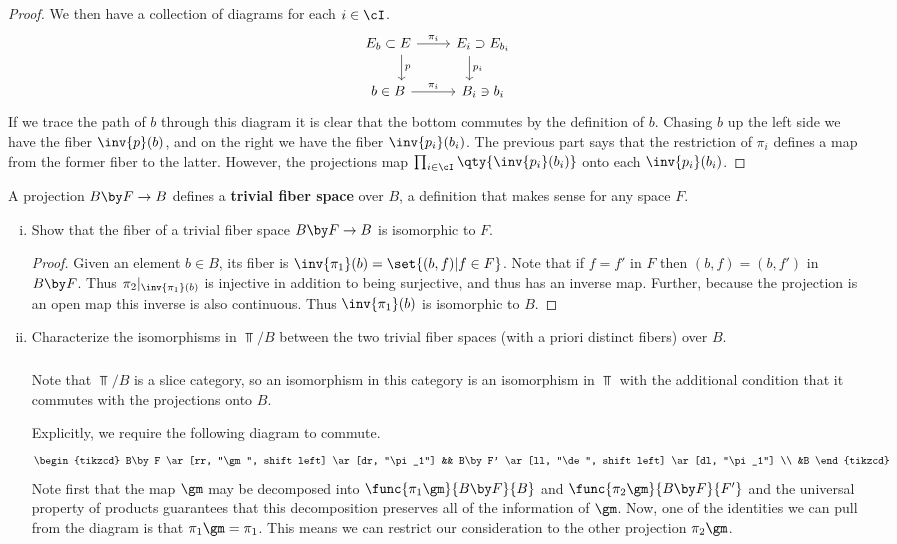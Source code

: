 \documentclass[main.tex]{subfiles}
\begin{document}
\begin{exercise}
\begin{enumerate}[(i)]
\begin{proof}
				We then have a collection of diagrams for each \(i\in\cI\).
				\begin{equation*}\begin{tikzcd}
						E_b\subset E \ar[r, "\pi_i"] \ar[d, "p", shift left=4] &
						E_i\supset E_{b_i} \ar[d, "p_i", shift right=4] \\
						b\in B \ar[r, "\pi_i"] & B_i\ni b_i
				\end{tikzcd}\end{equation*}
				If we trace the path of \(b\) through this diagram it is clear
				that the bottom commutes by the definition of \(b\). Chasing
				\(b\) up the left side we have the fiber \(\inv{p}(b)\), and on
				the right we have the fiber \(\inv{p_i}(b_i)\). The previous
				part says that the restriction of \(\pi_i\) defines a map from
				the former fiber to the latter. However, the projections map
				\(\prod_{i\in\cI}\qty{\inv{p_i}(b_i)}\) onto each
				\(\inv{p_i}(b_i)\).
			\end{proof}
	\end{enumerate}
	A projection \(B\by F\to B\) defines a \textbf{trivial fiber space} over
	\(B\), a definition that makes sense for any space \(F\).
	\begin{enumerate}[(i),resume]
		\item Show that the fiber of a trivial fiber space \(B\by F\to B\) is
			isomorphic to \(F\).
			\begin{proof}
				Given an element \(b\in B\), its fiber is
				\(\inv{\pi_1}(b)=\set{(b,f)|f\in F}\). Note that if \(f=f'\) in
				\(F\) then \((b,f)=(b,f')\) in \(B\by F\). Thus
				\(\pi_2|_{\inv{\pi_1}(b)}\) is injective in addition to being
				surjective, and thus has an inverse map. Further, because the
				projection is an open map this inverse is also continuous. Thus
				\(\inv{\pi_1}(b)\) is isomorphic to \(B\).
			\end{proof}

			\pagebreak
		\item Characterize the isomorphisms in \(\Top/B\) between the two
			trivial fiber spaces (with a priori distinct fibers) over \(B\).

			\subparagraph{}
			Note that \(\Top/B\) is a slice category, so an isomorphism in this
			category is an isomorphism in \(\Top\) with the additional condition
			that it commutes with the projections onto \(B\).

			Explicitly, we require the following diagram to commute.
			\[\begin{tikzcd}
					B\by F \ar[rr, "\gm", shift left] \ar[dr, "\pi_1"] &&
					B\by F' \ar[ll, "\de", shift left] \ar[dl, "\pi_1"] \\ &B
			\end{tikzcd}\]
			Note first that the map \(\gm\) may be decomposed into
			\(\func{\pi_1\gm}{B\by F}{B}\) and \(\func{\pi_2\gm}{B\by F}{F'}\)
			and the universal property of products guarantees that this
			decomposition preserves all of the information of \(\gm\). Now, one
			of the identities we can pull from the diagram is that
			\(\pi_1\gm=\pi_1\). This means we can restrict our consideration to
			the other projection \(\pi_2\gm\).


\end{enumerate}
\end{exercise}
\end{document}
